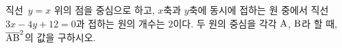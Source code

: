 직선~$y=x$ 위의 점을 중심으로 하고, $x$축과 $y$축에 동시에 접하는 원 중에서 직선~$3x-4y+12=0$과 접하는 원의 개수는 $2$이다. 두 원의 중심을 각각 $\mathrm{A}$, $\mathrm{B}$라 할 때, $\overline{\mathrm{AB}}^2$의 값을 구하시오.
